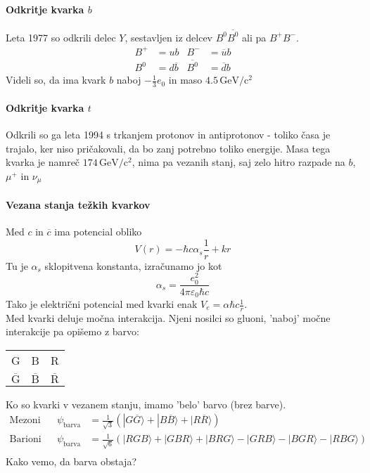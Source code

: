 \documentclass[a4paper]{article}
\begin{document}
\paragraph{Odkritje kvarka $b$} Leta 1977 so odkrili delec $Y$, sestavljen iz delcev $B^0\overline{B^0}$ ali pa $B^+B^-$.
\begin{align*}
    B^+ & = ub & B^- & = \overline{u}b \\
    B^0 & = d\overline{b} & \overline{B^0} & = \overline{d}b
\end{align*}
Videli so, da ima kvark $b$ naboj $\displaystyle{-\frac{1}{3}e_0}$ in maso $4.5\,\mathrm{GeV/c^2}$
\paragraph{Odkritje kvarka $t$} Odkrili so ga leta 1994 s trkanjem protonov in antiprotonov - toliko časa je trajalo, ker niso pričakovali, da bo zanj potrebno toliko energije. Masa tega kvarka je namreč $174\,\mathrm{GeV/c^2}$,
nima pa vezanih stanj, saj zelo hitro razpade na $b$, $\mu^+$ in $\nu_\mu$
\paragraph{Vezana stanja težkih kvarkov} Med $c$ in $\overline{c}$ ima potencial obliko $$V(r) = -\hbar c \alpha_s \frac{1}{r} + kr$$
Tu je $\alpha_s$ sklopitvena konstanta, izračunamo jo kot $$\alpha_s = \frac{e_0^2}{4\pi\varepsilon_0 \hbar c}$$ Tako je električni potencial med kvarki enak $V_e = \alpha \hbar c \frac{1}{r}$. \\[3mm]
Med kvarki deluje močna interakcija. Njeni nosilci so gluoni, 'naboj' močne interakcije pa opišemo z barvo:
\begin{table}[h!]
    \centering
    \begin{tabular}{c c c}
        G & B & R \\
        $\overline{\text{G}}$ & $\overline{\text{B}}$ & $\overline{\text{R}}$
    \end{tabular}
\end{table}
Ko so kvarki v vezanem stanju, imamo 'belo' barvo (brez barve).
\begin{align*}
    \text{Mezoni} && \psi_{\text{barva}} & = \frac{1}{\sqrt{3}}\left(|G\overline{G}\rangle + |B\overline{B}\rangle + |R\overline{R}\rangle\right) \\
    \text{Barioni} && \psi_{\text{barva}} & = \frac{1}{\sqrt{6}}\left(|RGB\rangle + |GBR\rangle + |BRG\rangle - |GRB\rangle - |BGR\rangle - |RBG\rangle\right) \\
\end{align*}
Kako vemo, da barva obstaja? \\
\end{document}
